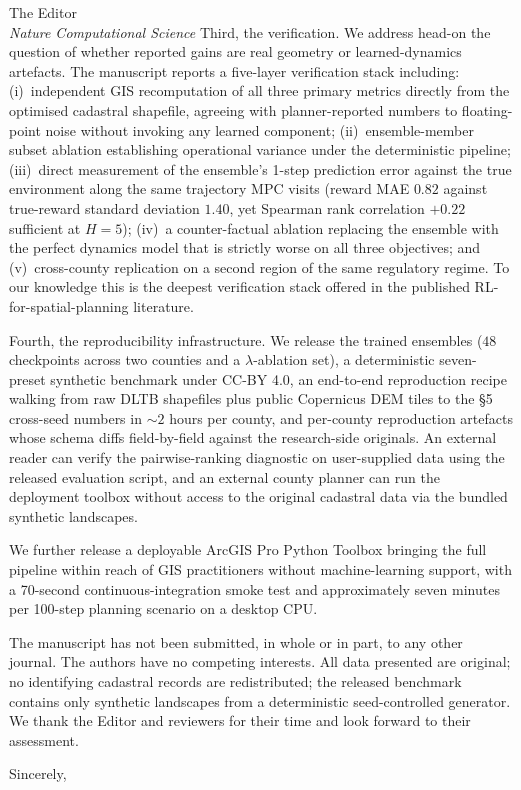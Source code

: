 \documentclass[11pt]{letter}
\begin{document}
\begin{letter}{The Editor \\ \textit{Nature Computational Science}}
Third, the verification. We address head-on the question of whether reported gains are real geometry or learned-dynamics artefacts. The manuscript reports a five-layer verification stack including: (i)~independent GIS recomputation of all three primary metrics directly from the optimised cadastral shapefile, agreeing with planner-reported numbers to floating-point noise without invoking any learned component; (ii)~ensemble-member subset ablation establishing operational variance under the deterministic pipeline; (iii)~direct measurement of the ensemble's 1-step prediction error against the true environment along the same trajectory MPC visits (reward MAE $0.82$ against true-reward standard deviation $1.40$, yet Spearman rank correlation $+0.22$ sufficient at $H=5$); (iv)~a counter-factual ablation replacing the ensemble with the perfect dynamics model that is strictly worse on all three objectives; and (v)~cross-county replication on a second region of the same regulatory regime. To our knowledge this is the deepest verification stack offered in the published RL-for-spatial-planning literature.

Fourth, the reproducibility infrastructure. We release the trained ensembles ($48$ checkpoints across two counties and a $\lambda$-ablation set), a deterministic seven-preset synthetic benchmark under CC-BY 4.0, an end-to-end reproduction recipe walking from raw DLTB shapefiles plus public Copernicus DEM tiles to the §5 cross-seed numbers in $\sim$$2$ hours per county, and per-county reproduction artefacts whose schema diffs field-by-field against the research-side originals. An external reader can verify the pairwise-ranking diagnostic on user-supplied data using the released evaluation script, and an external county planner can run the deployment toolbox without access to the original cadastral data via the bundled synthetic landscapes.

We further release a deployable ArcGIS Pro Python Toolbox bringing the full pipeline within reach of GIS practitioners without machine-learning support, with a 70-second continuous-integration smoke test and approximately seven minutes per 100-step planning scenario on a desktop CPU.

The manuscript has not been submitted, in whole or in part, to any other journal. The authors have no competing interests. All data presented are original; no identifying cadastral records are redistributed; the released benchmark contains only synthetic landscapes from a deterministic seed-controlled generator. We thank the Editor and reviewers for their time and look forward to their assessment.

\closing{Sincerely,}

\end{letter}
\end{document}
